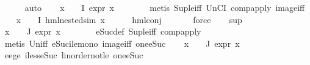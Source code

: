 \begin{isabellebody}
\ \ \ \ \isamarkupfalse%
\ auto\isanewline
\ \ \isamarkupfalse%
\ {\isachardoublequoteopen}{\isasymforall}x\ {\isasymin}\ {\isasymPhi}\ {\isacharbackquote}{\kern0pt}\ I{\isachardot}{\kern0pt}\ expr{\isacharunderscore}{\kern0pt}{}\ x\ {\isasymle}\ {}{\isachardoublequoteclose}\isanewline
\ \ \ \ \isamarkupfalse%
\ {\isacharparenleft}{\kern0pt}metis\ Sup{\isacharunderscore}{\kern0pt}le{\isacharunderscore}{\kern0pt}iff\ UnCI\ comp{\isacharunderscore}{\kern0pt}apply\ image{\isacharunderscore}{\kern0pt}iff{\isacharparenright}{\kern0pt}\isanewline
\ \ \isamarkupfalse%
\ {\isachardoublequoteopen}{\isasymforall}x\ {\isasymin}\ {\isasymPhi}\ {\isacharbackquote}{\kern0pt}\ I{\isachardot}{\kern0pt}\ hml{\isacharunderscore}{\kern0pt}{}{\isacharunderscore}{\kern0pt}nested{\isacharunderscore}{\kern0pt}sim\ x{\isachardoublequoteclose}\isanewline
\ \ \ \ \isamarkupfalse%
\ hml{\isacharunderscore}{\kern0pt}conj\ \isanewline
\ \ \ \ \isamarkupfalse%
\ force\isanewline
\ \ \isamarkupfalse%
\ sup\ \isamarkupfalse%
\ {\isachardoublequoteopen}{\isasymforall}x\ {\isasymin}\ {\isasymPhi}\ {\isacharbackquote}{\kern0pt}\ J{\isachardot}{\kern0pt}\ expr{\isacharunderscore}{\kern0pt}{}\ x\ {\isasymle}\ {}{\isachardoublequoteclose}\isanewline
\ \ \ \ \isamarkupfalse%
\ eSuc{\isacharunderscore}{\kern0pt}def\ Sup{\isacharunderscore}{\kern0pt}le{\isacharunderscore}{\kern0pt}iff\ comp{\isacharunderscore}{\kern0pt}apply\isanewline
\ \ \ \ \isamarkupfalse%
\ {\isacharparenleft}{\kern0pt}metis\ Un{\isacharunderscore}{\kern0pt}iff\ eSuc{\isacharunderscore}{\kern0pt}ile{\isacharunderscore}{\kern0pt}mono\ image{\isacharunderscore}{\kern0pt}iff\ one{\isacharunderscore}{\kern0pt}eSuc{\isacharparenright}{\kern0pt}\isanewline
\ \ \isamarkupfalse%
\ {\isachardoublequoteopen}{\isasymforall}x\ {\isasymin}\ {\isasymPhi}\ {\isacharbackquote}{\kern0pt}\ J{\isachardot}{\kern0pt}\ expr{\isacharunderscore}{\kern0pt}{}\ x\ {\isasymle}\ {}{\isachardoublequoteclose}\isanewline
\ \ \ \ \isamarkupfalse%
\ e{}{\isacharunderscore}{\kern0pt}e{}{\isacharunderscore}{\kern0pt}ge{\isacharunderscore}{\kern0pt}{}\ iless{\isacharunderscore}{\kern0pt}eSuc{}\ linorder{\isacharunderscore}{\kern0pt}not{\isacharunderscore}{\kern0pt}le\ one{\isacharunderscore}{\kern0pt}eSuc\ \isamarkupfalse%

\end{isabellebody}
